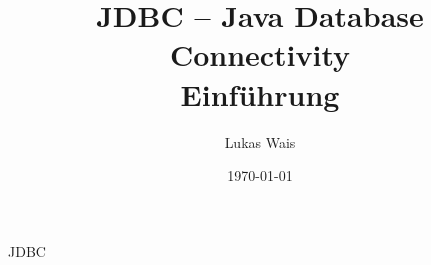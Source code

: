 \documentclass[a4paper]{article}
\title{JDBC – Java Database Connectivity \\ Einführung}
\author{Lukas Wais}
\date{\today}
\begin{document}
	\maketitle
	{JDBC}
	\listoffigures
\end{document}
